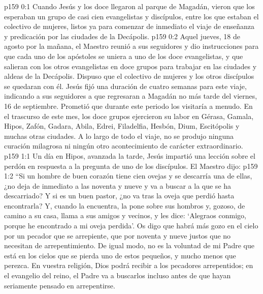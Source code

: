 \author{Comisión de seres intermedios}
\vs p159 0:1 Cuando Jesús y los doce llegaron al parque de Magadán, vieron que los esperaban un grupo de casi cien evangelistas y discípulos, entre los que estaban el colectivo de mujeres, listos ya para comenzar de inmediato el viaje de enseñanza y predicación por las ciudades de la Decápolis.
\vs p159 0:2 Aquel jueves, 18 de agosto por la mañana, el Maestro reunió a sus seguidores y dio instrucciones para que cada uno de los apóstoles se uniera a uno de los doce evangelistas, y que salieran con los otros evangelistas en doce grupos para trabajar en las ciudades y aldeas de la Decápolis. Dispuso que el colectivo de mujeres y los otros discípulos se quedaran con él. Jesús fijó una duración de cuatro semanas para este viaje, indicando a sus seguidores a que regresaran a Magadán no más tarde del viernes, 16 de septiembre. Prometió que durante este periodo los visitaría a menudo. En el trascurso de este mes, los doce grupos ejercieron su labor en Gérasa, Gamala, Hipos, Zafón, Gadara, Abila, Edrei, Filadelfia, Hesbón, Dium, Escitópolis y muchas otras ciudades. A lo largo de todo el viaje, no se produjo ninguna curación milagrosa ni ningún otro acontecimiento de carácter extraordinario.
\vs p159 1:1 Un día en Hipos, avanzada la tarde, Jesús impartió una lección sobre el perdón en respuesta a la pregunta de uno de los discípulos. El Maestro dijo:
\vs p159 1:2 \pc “Si un hombre de buen corazón tiene cien ovejas y se descarría una de ellas, ¿no deja de inmediato a las noventa y nueve y va a buscar a la que se ha descarriado? Y si es un buen pastor, ¿no va tras la oveja que perdió hasta encontrarla? Y, cuando la encuentra, la pone sobre sus hombros y, gozoso, de camino a su casa, llama a sus amigos y vecinos, y les dice: ‘Alegraos conmigo, porque he encontrado a mi oveja perdida’. Os digo que habrá más gozo en el cielo por un pecador que se arrepiente, que por noventa y nueve justos que no necesitan de arrepentimiento. De igual modo, no es la voluntad de mi Padre que está en los cielos que se pierda uno de estos pequeños, y mucho menos que perezca. En vuestra religión, Dios podrá recibir a los pecadores arrepentidos; en el evangelio del reino, el Padre va a buscarlos incluso antes de que hayan seriamente pensado en arrepentirse.
